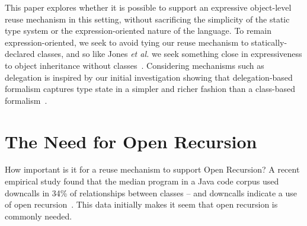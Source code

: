 \documentclass[preprint,10pt]{sigplanconf}
\begin{document}
This paper explores whether it is possible to support an expressive
object-level reuse mechanism in this setting, without sacrificing
the simplicity of the static type system or the expression-oriented
nature of the language.  To remain expression-oriented, we seek to
avoid tying our reuse mechanism to statically-declared classes,
and so like Jones \textit{et al.} we seek something close in
expressiveness to object inheritance without
classes~\cite{jones:2016:inheritance}.
Considering mechanisms such
as delegation is inspired by our initial 
investigation showing that delegation-based formalism captures type state in a simpler and richer fashion than a class-based formalism~\cite{li:2015:ftfjp-typestate}.


\section{The Need for Open Recursion}


How important is it for a reuse mechanism to support Open Recursion?
A recent empirical study found that the median program
in a Java code corpus used downcalls in 34\% of relationships
between classes -- and downcalls indicate a use of open
recursion~\cite{tempero2013programmers}.
This data initially makes it seem that open recursion is commonly
needed.

\end{document}
